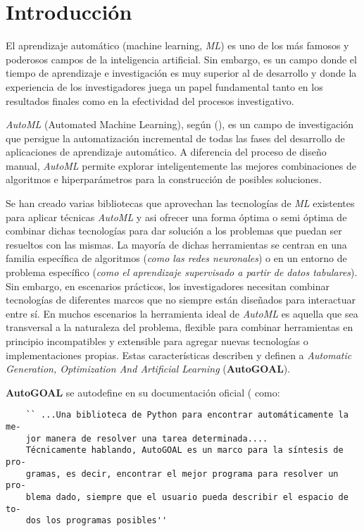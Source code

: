 \chapter*{Introducción}\label{chapter:introduction}


El aprendizaje automático (machine learning, {\it ML}) es uno de los más famosos
y poderosos campos de la inteligencia artificial. Sin embargo, es un campo
donde el tiempo de aprendizaje e investigación es muy superior al de desarrollo
y donde la experiencia de los investigadores juega un papel fundamental tanto
en los resultados finales como en la efectividad del procesos investigativo.

    {\it AutoML} (Automated Machine Learning), según (\cite{autoML}), es un campo de investigación
que persigue la automatización incremental de todas las fases del desarrollo
de aplicaciones de aprendizaje automático. A diferencia del proceso de diseño
manual, {\it AutoML} permite explorar inteligentemente las mejores combinaciones
de algoritmos e hiperparámetros para la construcción de posibles soluciones.

Se han creado varias bibliotecas que aprovechan las tecnologías de {\it ML}
existentes para aplicar técnicas {\it AutoML} y asi ofrecer una forma óptima
o semi óptima de combinar dichas tecnologías para dar solución a
los problemas que puedan ser resueltos con las mismas. La mayoría de dichas
herramientas se centran en una familia específica de algoritmos ({\it como las
        redes neuronales}) o en un entorno de problema específico ({\it como el
        aprendizaje supervisado a partir de datos tabulares}). Sin embargo, en
escenarios prácticos, los investigadores necesitan combinar tecnologías de
diferentes marcos que no siempre están diseñados para interactuar entre sí.
En muchos escenarios la herramienta ideal de {\it AutoML} es aquella que sea
transversal a la naturaleza del problema, flexible para combinar herramientas
en principio incompatibles y extensible para agregar nuevas tecnologías o
implementaciones propias. Estas características describen y definen a
    {\it Automatic Generation, Optimization And Artificial Learning} ({\bf AutoGOAL}).

    {\bf AutoGOAL} se autodefine en su documentación oficial (\cite{autogoal}  como:

\begin{verbatim}
    `` ...Una biblioteca de Python para encontrar automáticamente la me-
    jor manera de resolver una tarea determinada.... 
    Técnicamente hablando, AutoGOAL es un marco para la síntesis de pro-
    gramas, es decir, encontrar el mejor programa para resolver un pro-
    blema dado, siempre que el usuario pueda describir el espacio de to-
    dos los programas posibles''
\end{verbatim}


